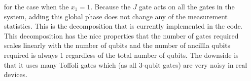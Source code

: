 \documentclass{article}
\begin{document}
\begin{onehalfspace}
for the case when the $x_1=1$. Because the $J$ gate acts on all the gates in the system, adding this global phase does not change any of the measurement statistics. This is the decomposition that is currently implemented in the code.\\

This decomposition has the nice properties that the number of gates required scales linearly with the number of qubits and the number of ancillla qubits required is always 1 regardless of the total number of qubits. The downside is that it uses many Toffoli gates which (as all 3-qubit gates) are very noisy in real devices.

\end{onehalfspace} %
%
%
\end{document}
